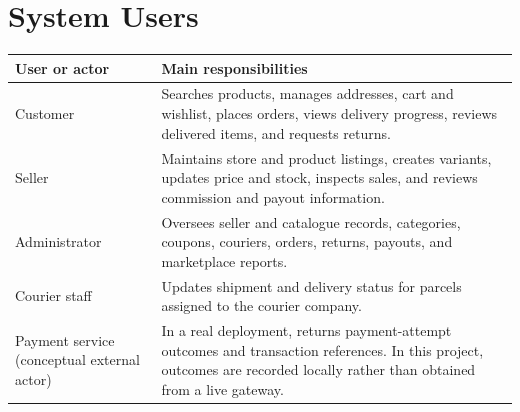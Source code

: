 \documentclass[11pt,a4paper,oneside]{report}
\begin{document}
\section{System Users}
\begin{longtable}{P{0.25\textwidth}P{0.67\textwidth}}
\toprule
\textbf{User or actor} & \textbf{Main responsibilities}\\\midrule
Customer & Searches products, manages addresses, cart and wishlist, places orders, views delivery progress, reviews delivered items, and requests returns.\\
Seller & Maintains store and product listings, creates variants, updates price and stock, inspects sales, and reviews commission and payout information.\\
Administrator & Oversees seller and catalogue records, categories, coupons, couriers, orders, returns, payouts, and marketplace reports.\\
Courier staff & Updates shipment and delivery status for parcels assigned to the courier company.\\
Payment service (conceptual external actor) & In a real deployment, returns payment-attempt outcomes and transaction references. In this project, outcomes are recorded locally rather than obtained from a live gateway.\\
\bottomrule
\end{longtable}
\end{document}
